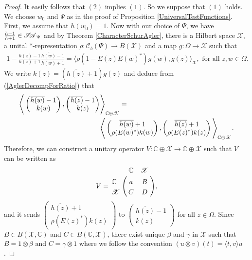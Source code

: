 \documentclass[12pt]{amsart}
\theoremstyle{definition}
\numberwithin{equation}{section}
\newcommand{\X}{\mathscr{X}}
\newcommand{\SA}{\mathscr{S\mspace{-5mu}A}}
\newcommand{\CB}{\mathcal{C}_b(\Psi)}
\begin{document}
\begin{proof}
	It easily follows that $(2)$ implies $(1)$. So we suppose that $(1)$ holds. We choose $w_0$ and $\Psi$ as in the proof of Proposition \ref{UniversalTestFunctions}. First, we assume that $h(w_0)=1$. Now with our choice of $\Psi$, we have $\frac{h-1}{h+1}\in \SA_\Psi$ and by Theorem \ref{CharacterSchurAgler}, there is a Hilbert space $\X$, a unital $*$-representation $\rho:\CB\rightarrow B(\X)$ and a map $g:\Omega\rightarrow \X$ such that 
	\begin{align}\label{AglerDecompForRatio}
		1-\frac{h(z)-1}{h(z)+1}\frac{\overline{h(w)}-1}{\overline{h(w)}+1}=\Big\langle\rho(1-E(z)E(w)^*)g(w),g(z)\Big\rangle_\X,\,\,\text{for all}\,\,z,w\in \Omega.
	\end{align}
	We write $k(z)=(\overline{h(z)}+1)g(z)$ and deduce from (\ref{AglerDecompForRatio}) that
	\begin{align}\label{InnerProductForm}
		\Bigg\langle \begin{pmatrix}  \overline{h(w)}-1\\ k(w) \end{pmatrix}, \begin{pmatrix} \overline{h(z)}-1\\ k(z)  \end{pmatrix} &\Bigg\rangle_{ \mathbb{C}\oplus \X}=\\
		&\Bigg\langle \begin{pmatrix}  \overline{h(w)}+1\\ \rho(E(w)^*)k(w) \end{pmatrix}, \begin{pmatrix} \overline{h(z)}+1\\ \rho(E(z)^*)k(z)  \end{pmatrix} \Bigg\rangle_{ \mathbb{C}\oplus \X}.\notag
	\end{align}
	Therefore, we can construct a unitary operator $V:\mathbb{C}\oplus\X\rightarrow \mathbb{C}\oplus \X$ such that $V$ can be written as
	\begin{align*}
		V=
		\bordermatrix{ & \mathbb{C} & \X \cr
			\mathbb{C} & a & B \cr
			\X & C & D},
	\end{align*}
	and it sends $\begin{pmatrix} \overline{h(z)}+1\\ \rho(E(z)^*)k(z)  \end{pmatrix}$ to $\begin{pmatrix} \overline{h(z)}-1\\ k(z)  \end{pmatrix}$ for all $z\in \Omega$. Since $B\in B(\X,\mathbb{C})$ and $C\in B(\mathbb{C},\X)$, there exist unique $\beta$ and $\gamma$ in $\X$ such that $B=1\otimes \beta$ and $C=\gamma\otimes 1$ where we follow the convention $(u\otimes v)(t)=\langle t,v\rangle u$. 
	

\end{proof}
\end{document}
